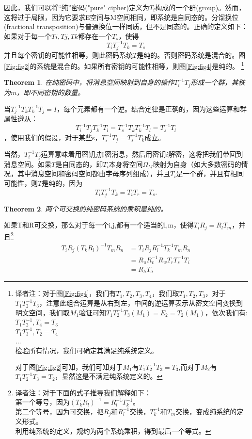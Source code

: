 \documentclass[]{article}
\newtheorem{theorem}{Theorem}
\begin{document}
因此，我们可以将“纯”密码("pure" cipher)定义为$T_i$构成的一个群(group)。然而，这将过于局限，因为它要求E空间与M空间相同，即系统是自同态的。分馏换位(fractional transposition)与普通换位一样同质，但不是同态的。正确的定义如下：如果对于每一个$Ti,Tj,Tk$都存在一个$T_s$，使得
\[T_iT^{-1}_jT_k=T_s\]
并且每个密钥的可能性相等，则此密码系统$T$是纯的。否则密码系统是混合的。图\ref{Fig:fig2}的系统是混合的。如果所有密钥的可能性相等，则图\ref{Fig:fig4}是纯的。
\footnote{译者注：对于图\ref{Fig:fig4}，我们有$T_1,T_2,T_3,T_4$，我们取$T_1,T_2,T_3$，对于$T_1T_2^{-1}T_3$，注意此组合运算是从右到左，中间的逆运算表示从密文空间变换到明文空间，我们取$M_1$验证可知$T_1T_2^{-1}T_3(M_1)=E_2=T_2(M_1)$，依次我们有:\\
$T_1T_2^{-1},T_4=T_3$\\
$T_1T_3^{-1},T_2=T_4$\\
$\ldots$\\
检验所有情况，我们可确定其满足纯系统定义。\par
对于图\ref{Fig:fig2}可知，我们可知对于$M_1$有$T_1T_2^{-1}T_3=T_3$,而对于$M_2$有$T_1T_2^{-1}T_3=T_2$，显然这是不满足纯系统定义的。
}

\begin{theorem}
	在纯密码中，将消息空间映射到自身的操作$T^{-1}_i T_j$形成一个群，其秩为$m$，即不同密钥的数量。
\end{theorem}

当$T^{-1}_j T_k T^{-1}_k T_j =  I$，每个元素都有一个逆。结合定律是正确的，因为这些运算和群属性遵从：
\[T^{-1}_i T_j T^{-1}_k T_l = T^{-1}_s T_k T^{-1}_k T_l = T^{-1}_s T_l\]
，使用我们的假设，对于某些s，$T^{-1}_i T_j= T^{-1}_s T_k$成立。

当然，$T^{-1}_iT_j$运算意味着用密钥$j$加密消息，然后用密钥$i$解密，这将把我们带回到消息空间。如果$T$是自同态的，即$T_i$本身将空间$\Omega_M$映射为自身（如大多数密码的情况，其中消息空间和密码空间都由字母序列组成），并且$T_i$是一个群，并且有相同可能性，则$T$是纯的，因为
\[T_iT^{-1}_jT_k=T_iT_r=T_s.\]

\begin{theorem}
	两个可交换的纯密码系统的乘积是纯的。
\end{theorem}

如果T和R可交换，那么对于每一个i,j,都有一个适当的l,m，使得$T_i R_j= R_l T_m$，并且\footnote{
	译者注：对于下面的式子推导我们解释如下：\\
	第一个等号，因为$(T_kR_l)^{-1}=R_l^{-1}T_k^{-1}$。\\
	第二个等号，因为可交换，把$R_j$和$R_l^{-1}$交换，$T_k^{-1}$和$T_m$交换，变成纯系统的定义形式。\\
	利用纯系统的定义，规约为两个系统乘积，得到最后一个等式。
}
\begin{equation}
	\begin{aligned}
		T_iR_j(T_kR_l)^{-1}T_mR_n &=T_i R_j R^{-1}_l T^{-1}_k T_m R_n \\
		                          &=R_u R^{-1}_vR_wT_rT^{-1}_sT_i\\
		                          &=R_hT_\sigma
	\end{aligned} 
\end{equation}
\end{document}
